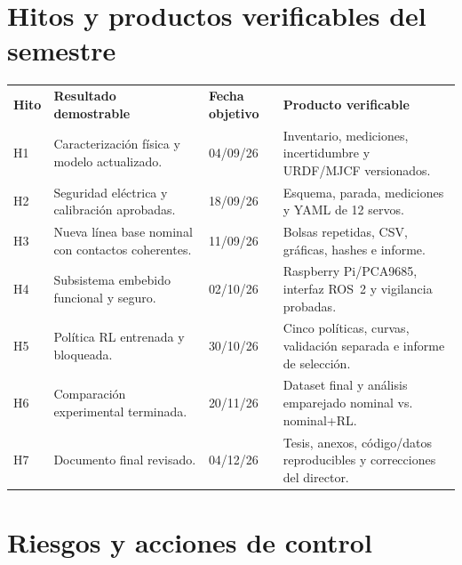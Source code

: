 \documentclass[10pt,letterpaper]{article}
\begin{document}
\section{Hitos y productos verificables del semestre}

\begin{tabularx}{\textwidth}{p{1.1cm}Yp{2.3cm}p{4.8cm}}
\color{white}\textbf{Hito} & \color{white}\textbf{Resultado demostrable} & \color{white}\textbf{Fecha objetivo} & \color{white}\textbf{Producto verificable}\\
H1 & Caracterización física y modelo actualizado. & 04/09/26 & Inventario, mediciones, incertidumbre y URDF/MJCF versionados.\\
H2 & Seguridad eléctrica y calibración aprobadas. & 18/09/26 & Esquema, parada, mediciones y YAML de 12 servos.\\
H3 & Nueva línea base nominal con contactos coherentes. & 11/09/26 & Bolsas repetidas, CSV, gráficas, hashes e informe.\\
H4 & Subsistema embebido funcional y seguro. & 02/10/26 & Raspberry Pi/PCA9685, interfaz ROS~2 y vigilancia probadas.\\
H5 & Política RL entrenada y bloqueada. & 30/10/26 & Cinco políticas, curvas, validación separada e informe de selección.\\
H6 & Comparación experimental terminada. & 20/11/26 & Dataset final y análisis emparejado nominal vs. nominal+RL.\\
H7 & Documento final revisado. & 04/12/26 & Tesis, anexos, código/datos reproducibles y correcciones del director.\\
\end{tabularx}

\section{Riesgos y acciones de control}
\end{document}

